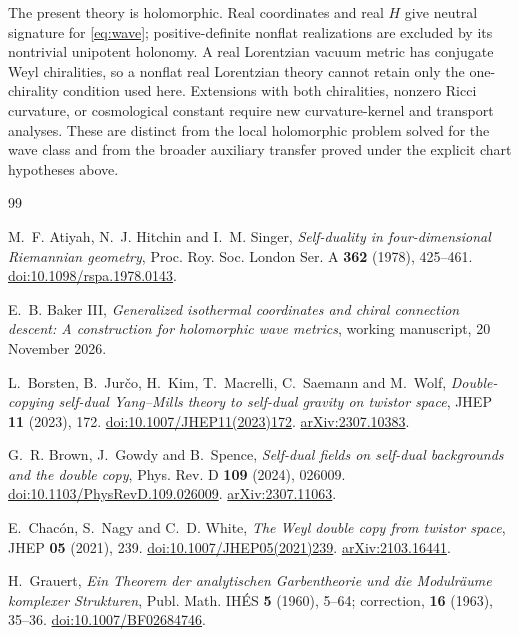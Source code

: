 \documentclass[11pt]{article}
\numberwithin{equation}{section}
\theoremstyle{definition}
\theoremstyle{remark}
\begin{document}
The present theory is holomorphic. Real coordinates and real $H$ give neutral signature for \eqref{eq:wave}; positive-definite nonflat realizations are excluded by its nontrivial unipotent holonomy. A real Lorentzian vacuum metric has conjugate Weyl chiralities, so a nonflat real Lorentzian theory cannot retain only the one-chirality condition used here. Extensions with both chiralities, nonzero Ricci curvature, or cosmological constant require new curvature-kernel and transport analyses. These are distinct from the local holomorphic problem solved for the wave class and from the broader auxiliary transfer proved under the explicit chart hypotheses above.
\begin{thebibliography}{99}
\raggedright

M.~F. Atiyah, N.~J. Hitchin and I.~M. Singer,
\emph{Self-duality in four-dimensional Riemannian geometry},
Proc. Roy. Soc. London Ser. A \textbf{362} (1978), 425--461.
\href{https://doi.org/10.1098/rspa.1978.0143}{doi:10.1098/rspa.1978.0143}.

E.~B. Baker III,
\emph{Generalized isothermal coordinates and chiral connection descent:
A construction for holomorphic wave metrics}, working manuscript,
20 November 2026.

L.~Borsten, B.~Jur\v{c}o, H.~Kim, T.~Macrelli, C.~Saemann and M.~Wolf,
\emph{Double-copying self-dual Yang--Mills theory to self-dual gravity on twistor space},
JHEP \textbf{11} (2023), 172.
\href{https://doi.org/10.1007/JHEP11(2023)172}{doi:10.1007/JHEP11(2023)172}.
\href{https://arxiv.org/abs/2307.10383}{arXiv:2307.10383}.

G.~R. Brown, J.~Gowdy and B.~Spence,
\emph{Self-dual fields on self-dual backgrounds and the double copy},
Phys. Rev. D \textbf{109} (2024), 026009.
\href{https://doi.org/10.1103/PhysRevD.109.026009}{doi:10.1103/PhysRevD.109.026009}.
\href{https://arxiv.org/abs/2307.11063}{arXiv:2307.11063}.

E.~Chac\'on, S.~Nagy and C.~D. White,
\emph{The Weyl double copy from twistor space},
JHEP \textbf{05} (2021), 239.
\href{https://doi.org/10.1007/JHEP05(2021)239}{doi:10.1007/JHEP05(2021)239}.
\href{https://arxiv.org/abs/2103.16441}{arXiv:2103.16441}.

H.~Grauert,
\emph{Ein Theorem der analytischen Garbentheorie und die Modulr\"aume komplexer Strukturen},
Publ. Math. IH\'ES \textbf{5} (1960), 5--64;
correction, \textbf{16} (1963), 35--36.
\href{https://doi.org/10.1007/BF02684746}{doi:10.1007/BF02684746}.


\end{thebibliography}
\end{document}
